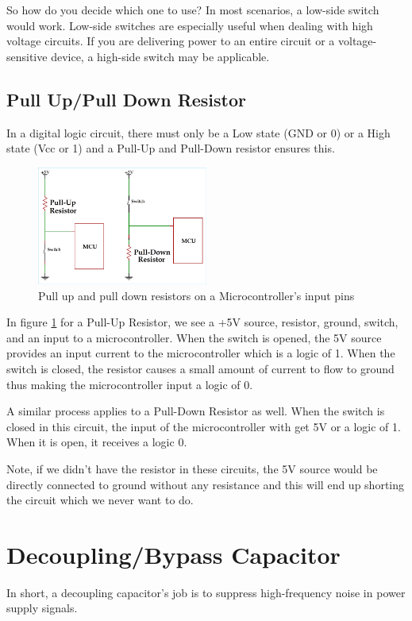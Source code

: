 \documentclass{article}
\begin{document}
So how do you decide which one to use? In most scenarios, a low-side switch would work. Low-side switches are especially useful when dealing with high voltage circuits. If you are delivering power to an entire circuit or a voltage-sensitive device, a high-side switch may be applicable.

\subsection{Pull Up/Pull Down Resistor}
In a digital logic circuit, there must only be a Low state (GND or 0) or a High state (Vcc or 1) and a Pull-Up and Pull-Down resistor ensures this. 

\begin{figure} [h]
    \centering
    \includegraphics[width = 0.5\textwidth]{img/Pull-up-and-Pull-down-Resistor.png}
    \caption{Pull up and pull down resistors on a Microcontroller's input pins}
    \label{fig:PullUpDown}
\end{figure}

In figure \ref{fig:PullUpDown} for a Pull-Up Resistor, we see a +5V source, resistor, ground, switch, and an input to a microcontroller. When the switch is opened, the 5V source provides an input current to the microcontroller which is a logic of 1. When the switch is closed, the resistor causes a small amount of current to flow to ground thus making the microcontroller input a logic of 0. 

A similar process applies to a Pull-Down Resistor as well. When the switch is closed in this circuit, the input of the microcontroller with get 5V or a logic of 1. When it is open, it receives a logic 0.

Note, if we didn’t have the resistor in these circuits, the 5V source would be directly connected to ground without any resistance and this will end up shorting the circuit which we never want to do.

\section{Decoupling/Bypass Capacitor}
In short, a decoupling capacitor's job is to suppress high-frequency noise in power supply signals.
\end{document}
